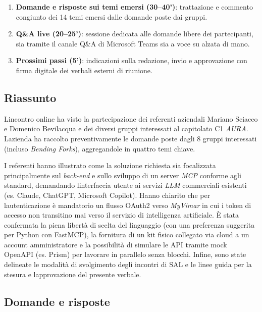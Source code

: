 \documentclass[12pt,a4paper]{article}
\newcommand{\tightlist}{\setlength{\itemsep}{1pt}\setlength{\parskip}{0pt}}
\begin{document}
\begin{enumerate}
\def\labelenumi{\arabic{enumi}.}
\tightlist
\item
  \textbf{Domande e risposte sui temi emersi (30--40')}: trattazione e commento congiunto dei 14 temi emersi dalle domande poste dai gruppi.
\item
  \textbf{Q\&A live (20--25')}: sessione dedicata alle domande libere dei partecipanti, sia tramite il canale Q\&A di Microsoft Teams sia a voce su alzata di mano.
\item
  \textbf{Prossimi passi (5')}: indicazioni sulla redazione, invio e approvazione con firma digitale dei verbali esterni di riunione.
\end{enumerate}

\hypertarget{riassunto}{%
\subsection{Riassunto}}

L\textquotesingle incontro online ha visto la partecipazione dei referenti aziendali Mariano Sciacco e Domenico Bevilacqua e dei diversi gruppi interessati al capitolato C1 \emph{AURA}. L\textquotesingle azienda ha raccolto preventivamente le domande poste dagli 8 gruppi interessati (incluso \emph{Bending Forks}), aggregandole in quattro temi chiave.

I referenti hanno illustrato come la soluzione richiesta sia focalizzata principalmente sul \emph{back-end} e sullo sviluppo di un server \emph{MCP} conforme agli standard, demandando l\textquotesingle interfaccia utente ai servizi \emph{LLM} commerciali esistenti (es. Claude, ChatGPT, Microsoft Copilot). Hanno chiarito che per l\textquotesingle autenticazione è mandatorio un flusso OAuth2 verso \emph{MyVimar} in cui i token di accesso non transitino mai verso il servizio di intelligenza artificiale. È stata confermata la piena libertà di scelta del linguaggio (con una preferenza suggerita per Python con FastMCP), la fornitura di un kit fisico collegato via cloud a un account amministratore e la possibilità di simulare le API tramite mock OpenAPI (es. Prism) per lavorare in parallelo senza blocchi. Infine, sono state delineate le modalità di svolgimento degli incontri di SAL e le linee guida per la stesura e l\textquotesingle approvazione del presente verbale.

\hypertarget{domande-e-risposte}{%
\subsection{Domande e risposte}}
\end{document}
